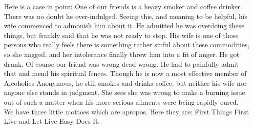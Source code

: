 \begin{biblechapter}
Here is a case in point:  One of our friends is a heavy smoker and coffee drinker.  There was no doubt he over-indulged.  Seeing this, and meaning to be helpful, his wife commenced to admonish him about it.  He admitted he was overdoing these things, but frankly said that he was not ready to stop.  His wife is one of those persons who really feels there is something rather sinful about these commodities, so she nagged, and her intolerance finally threw him into a fit of anger.  He got drunk.
Of course our friend was wrong-dead wrong.  He had to painfully admit that and mend his spiritual fences.  Though he is now a most effective member of Alcoholics Anonymous, he still smokes and drinks coffee, but neither his wife nor anyone else stands in judgment.  She sees she was wrong to make a burning issue out of such a matter when his more serious ailments were being rapidly cured.
We have three little mottoes which are apropos.  Here they are:
First Things First
Live and Let Live
Easy Does It.
\end{biblechapter}

